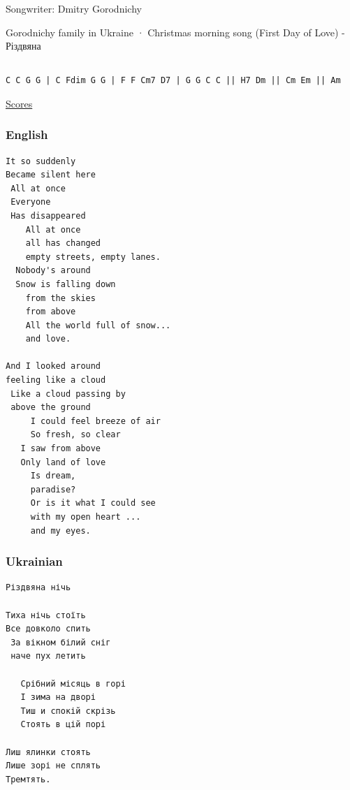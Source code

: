 \documentclass[
]{article}
\begin{document}
Songwriter: Dmitry Gorodnichy

Gorodnichy family in Ukraine · Christmas morning song (First Day of
Love) - Різдвяна

\hypertarget{section-20}{%
\subsection*{}\label{section-20}}

\begin{verbatim}
C C G G | C Fdim G G | F F Cm7 D7 | G G C C || H7 Dm || Cm Em || Am
\end{verbatim}

\href{http://gorodnichy.ca/First-Day-Of-Love.htm}{Scores}

\hypertarget{english-5}{%
\subsubsection*{English}\label{english-5}}

\begin{verbatim}
It so suddenly
Became silent here
 All at once
 Everyone
 Has disappeared
    All at once
    all has changed
    empty streets, empty lanes. 
  Nobody's around                    
  Snow is falling down 
    from the skies
    from above
    All the world full of snow...
    and love.

And I looked around
feeling like a cloud
 Like a cloud passing by
 above the ground
     I could feel breeze of air
     So fresh, so clear
   I saw from above
   Only land of love
     Is dream, 
     paradise?
     Or is it what I could see
     with my open heart ... 
     and my eyes.
\end{verbatim}

\hypertarget{ukrainian-4}{%
\subsubsection*{Ukrainian}\label{ukrainian-4}}

\begin{verbatim}
Різдвяна нічь

Тиха нічь стоїть
Все довколо спить
 За вікном білий сніг 
 наче пух летить

   Срібний місяць в горі
   І зима на дворі
   Тиш и спокій скрізь
   Стоять в цій порі

Лиш ялинки стоять
Лише зорі не сплять
Тремтять.
\end{verbatim}
\end{document}
